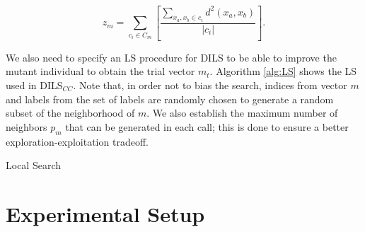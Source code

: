 \documentclass[review]{elsarticle}
\begin{document}
\begin{equation}
z_m = \sum_{c_i \in C_m} \left[ \frac{\sum_{x_a, x_b \in c_i} d^2(x_a,x_b)}{|c_i|}\right].
\label{eq4}
\end{equation}

We also need to specify an LS procedure for DILS to be able to improve the mutant individual to obtain the trial vector $m_t$. Algorithm \ref{alg:LS} shows the LS used in DILS$_{CC}$. Note that, in order not to bias the search, indices from vector $m$ and labels from the set of labels are randomly chosen to generate a random subset of the neighborhood of $m$. We also establish the maximum number of neighbors $p_m$ that can be generated in each call; this is done to ensure a better exploration-exploitation tradeoff.

\begin{algorithm}
	\SetNlSkip{0.5em}
	\BlankLine
	\BlankLine
	
	\caption{Local Search}\label{alg:LS}
\end{algorithm}

\clearpage

\section{Experimental Setup} \label{sec:expSetup}
\end{document}
